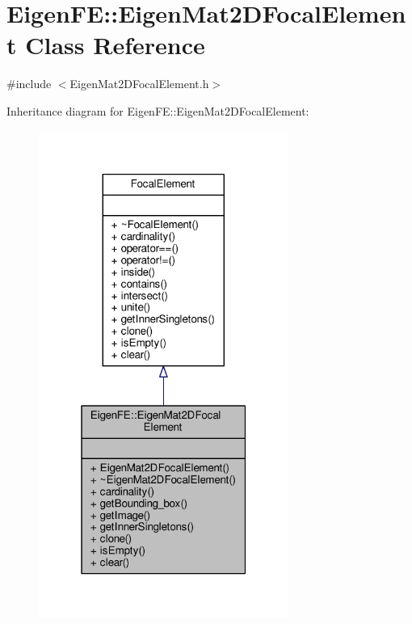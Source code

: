 \hypertarget{classEigenFE_1_1EigenMat2DFocalElement}{}\section{Eigen\+F\+E\+:\+:Eigen\+Mat2\+D\+Focal\+Element Class Reference}
\label{classEigenFE_1_1EigenMat2DFocalElement}


{\ttfamily \#include $<$Eigen\+Mat2\+D\+Focal\+Element.\+h$>$}



Inheritance diagram for Eigen\+F\+E\+:\+:Eigen\+Mat2\+D\+Focal\+Element\+:\nopagebreak
\begin{figure}[H]
\begin{center}
\leavevmode
\includegraphics[width=232pt]{classEigenFE_1_1EigenMat2DFocalElement__inherit__graph}
\end{center}
\end{figure}


